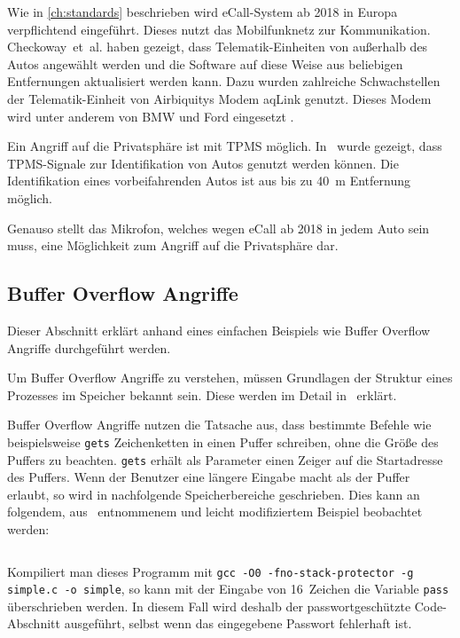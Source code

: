 Wie in \cref{ch:standards} beschrieben wird eCall-System ab 2018 in Europa
verpflichtend eingeführt. Dieses nutzt das Mobilfunknetz zur Kommunikation.
Checkoway~et~al. haben gezeigt, dass Telematik-Einheiten von außerhalb des
Autos angewählt werden und die Software auf diese Weise aus beliebigen
Entfernungen aktualisiert werden kann. Dazu wurden zahlreiche Schwachstellen
der Telematik-Einheit von Airbiquitys Modem aqLink genutzt. Dieses Modem wird
unter anderem von BMW und Ford eingesetzt \cite{AirbiquityBMW,AirbiquityFord}.

Ein Angriff auf die Privatsphäre ist mit TPMS möglich. In~\cite{Rouf2010} wurde
gezeigt, dass TPMS-Signale zur Identifikation von Autos genutzt werden können.
Die Identifikation eines vorbeifahrenden Autos ist aus bis zu \SI{40}{\meter}
Entfernung möglich.

Genauso stellt das Mikrofon, welches wegen eCall ab 2018 in jedem Auto sein
muss, eine Möglichkeit zum Angriff auf die Privatsphäre dar.


\subsection{Buffer Overflow Angriffe}\label{sec:Buffer-Overflow}
Dieser Abschnitt erklärt anhand eines einfachen Beispiels wie Buffer Overflow
Angriffe durchgeführt werden.

Um Buffer Overflow Angriffe zu verstehen, müssen Grundlagen der Struktur eines
Prozesses im Speicher bekannt sein. Diese werden im Detail
in~\cite{Silberschatz2005} erklärt.

Buffer Overflow Angriffe nutzen die Tatsache aus, dass bestimmte Befehle wie
beispielsweise \verb+gets+ Zeichenketten in einen Puffer schreiben, ohne die Größe
des Puffers zu beachten. \verb+gets+ erhält als Parameter einen Zeiger auf die
Startadresse des Puffers. Wenn der Benutzer eine längere Eingabe macht als der
Puffer erlaubt, so wird in nachfolgende Speicherbereiche geschrieben. Dies kann
an folgendem, aus~\cite{Arora2013} entnommenem und leicht modifiziertem
Beispiel beobachtet werden:

\inputminted[linenos, numbersep=5pt, tabsize=4, frame=lines, label=simple.c]{c}{simple.c}

Kompiliert man dieses Programm mit
\texttt{gcc -O0 -fno-stack-protector -g simple.c -o simple}, so kann mit der
Eingabe von 16~Zeichen die Variable \texttt{pass} überschrieben werden. In diesem
Fall wird deshalb der passwortgeschützte Code-Abschnitt ausgeführt, selbst
wenn das eingegebene Passwort fehlerhaft ist.

